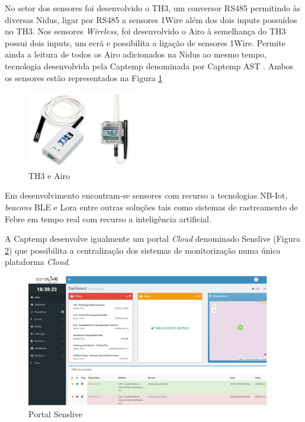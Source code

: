 No setor dos sensores foi desenvolvido o TH3, um conversor RS485 permitindo às diversas Nidus, ligar por RS485 a sensores 1Wire além dos dois inputs possuídos no TH3. Nos sensores \textit{Wireless}, foi desenvolvido o Airo à semelhança do TH3 possui dois inputs, um ecrã e possibilita a ligação de sensores 1Wire. Permite ainda a leitura de todos os Airo adicionados na Nidus ao mesmo tempo, tecnologia desenvolvida pela Captemp denominada por Captemp AST \cite{Captemp_AST}. Ambos os sensores estão representados na Figura \ref{figairoth3} 
\begin{figure}[ht]
  \centering
  \includegraphics[width=0.45\textwidth]{images/th3airo.png}
  \caption{ TH3 e Airo}\label{figairoth3}
\end{figure}
\par
Em desenvolvimento encontram-se sensores com recurso a tecnologias NB-Iot, \textit{beacons} BLE e Lora entre outras soluções tais como sistemas de rastreamento de Febre em tempo real com recurso a inteligência artificial.
\par
A Captemp desenvolve igualmente um portal \textit{Cloud} denominado Senslive (Figura \ref{figsenslive}) que possibilita a centralização dos sistemas de monitorização numa única plataforma \textit{Cloud}.

\begin{figure}[ht]
  \centering
  \includegraphics[width=0.95\textwidth]{images/mwsnap0791.png}
  \caption{ Portal Senslive}\label{figsenslive}
\end{figure}



